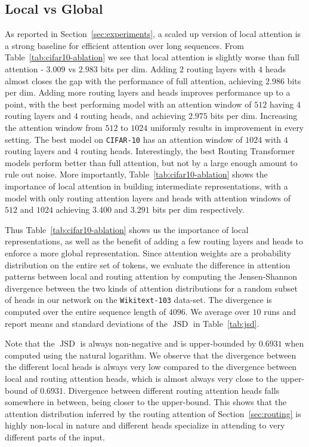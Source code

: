 \subsection{Local vs Global} As reported in Section~\ref{sec:experiments}, a scaled up version of local attention is a strong baseline for efficient attention over long sequences. From Table~\ref{tab:cifar10-ablation} we see that local attention is slightly worse than full attention - \(3.009\) vs \(2.983\) bits per dim. Adding \(2\) routing layers with \(4\) heads almost closes the gap with the performance of full attention, achieving \(2.986\) bits per dim. Adding more routing layers and heads improves performance up to a point, with the best performing model with an attention window of \(512\) having \(4\) routing layers and \(4\) routing heads, and achieving \(2.975\) bits per dim. Increasing the attention window from \(512\) to \(1024\) uniformly results in improvement in every setting. The best model on \texttt{CIFAR-10} has an attention window of \(1024\) with \(4\) routing layers and \(4\) routing heads. Interestingly, the best Routing Transformer models perform better than full attention, but not by a large enough amount to rule out noise. More importantly,  Table~\ref{tab:cifar10-ablation} shows the importance of local attention in building intermediate representations, with a model with only routing attention layers and heads with attention windows of \(512\) and \(1024\) achieving $3.400$ and $3.291$ bits per dim respectively.

Thus Table~\ref{tab:cifar10-ablation} shows us the importance of local representations, as well as the benefit of adding a few routing layers and heads to enforce a more global representation. Since attention weights are a probability distribution on the entire set of tokens, we evaluate the difference in attention patterns between local and routing attention by computing the Jensen-Shannon divergence between the two kinds of attention distributions for a random subset of heads in our network on the \texttt{Wikitext-103} data-set. The divergence is computed over the entire sequence length of \(4096\).
We average over \(10\) runs and report means and standard deviations of the \(\operatorname{JSD}\) in Table~\ref{tab:jsd}. 

Note that the \(\operatorname{JSD}\) is always non-negative and is upper-bounded by \(0.6931\)
when computed using the natural logarithm. We observe that the divergence between the different local heads is always very low compared to the divergence between local and routing attention heads, which is almost always very close to the upper-bound of \(0.6931\). 
Divergence between different routing attention heads falls somewhere in between, being closer to the upper-bound. This shows that the attention distribution inferred by the routing attention of Section~\ref{sec:routing}
is highly non-local in nature and different heads specialize in attending to very different parts of the input.

